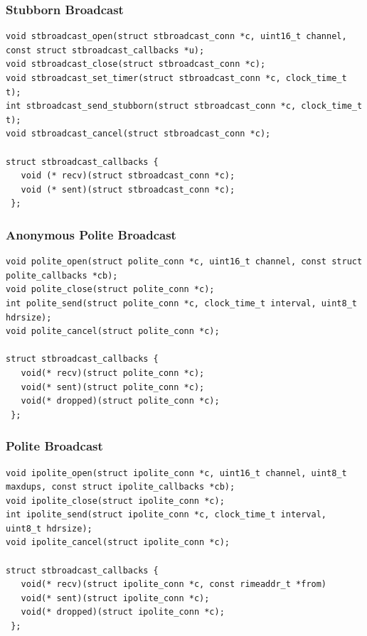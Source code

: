 \subsubsection{Stubborn Broadcast}

\begin{verbatim}
void stbroadcast_open(struct stbroadcast_conn *c, uint16_t channel, const struct stbroadcast_callbacks *u);
void stbroadcast_close(struct stbroadcast_conn *c);
void stbroadcast_set_timer(struct stbroadcast_conn *c, clock_time_t t);
int stbroadcast_send_stubborn(struct stbroadcast_conn *c, clock_time_t t);
void stbroadcast_cancel(struct stbroadcast_conn *c);

struct stbroadcast_callbacks {
   void (* recv)(struct stbroadcast_conn *c);
   void (* sent)(struct stbroadcast_conn *c);
 };
\end{verbatim}

\subsubsection{Anonymous Polite Broadcast}

\begin{verbatim}
void polite_open(struct polite_conn *c, uint16_t channel, const struct polite_callbacks *cb);
void polite_close(struct polite_conn *c);
int polite_send(struct polite_conn *c, clock_time_t interval, uint8_t hdrsize);
void polite_cancel(struct polite_conn *c);

struct stbroadcast_callbacks {
   void(* recv)(struct polite_conn *c);
   void(* sent)(struct polite_conn *c);
   void(* dropped)(struct polite_conn *c);
 };
\end{verbatim}

\subsubsection{Polite Broadcast}

\begin{verbatim}
void ipolite_open(struct ipolite_conn *c, uint16_t channel, uint8_t maxdups, const struct ipolite_callbacks *cb);
void ipolite_close(struct ipolite_conn *c);
int ipolite_send(struct ipolite_conn *c, clock_time_t interval, uint8_t hdrsize);
void ipolite_cancel(struct ipolite_conn *c);

struct stbroadcast_callbacks {
   void(* recv)(struct ipolite_conn *c, const rimeaddr_t *from)
   void(* sent)(struct ipolite_conn *c);
   void(* dropped)(struct ipolite_conn *c);
 };
\end{verbatim}

